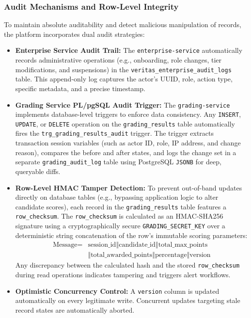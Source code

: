 \subsubsection{Audit Mechanisms and Row-Level Integrity}
To maintain absolute auditability and detect malicious manipulation of records, the platform incorporates dual audit strategies:
\begin{itemize}
    \item \textbf{Enterprise Service Audit Trail:} The \texttt{enterprise-service} automatically records administrative operations (e.g., onboarding, role changes, tier modifications, and suspensions) in the \texttt{veritas\_enterprise\_audit\_logs} table. This append-only log captures the actor's UUID, role, action type, specific metadata, and a precise timestamp.
    \item \textbf{Grading Service PL/pgSQL Audit Trigger:} The \texttt{grading-service} implements database-level triggers to enforce data consistency. Any \texttt{INSERT}, \texttt{UPDATE}, or \texttt{DELETE} operation on the \texttt{grading\_results} table automatically fires \linebreak the \texttt{trg\_grading\_results\_audit} trigger. The trigger extracts transaction session variables (such as actor ID, role, IP address, and change reason), compares the before and after states, and logs the change set in a separate \texttt{grading\_audit\_log} table using PostgreSQL \texttt{JSONB} for deep, queryable diffs.
    \item \textbf{Row-Level HMAC Tamper Detection:} To prevent out-of-band updates directly on database tables (e.g., bypassing application logic to alter candidate scores), each record in the \texttt{grading\_results} table features a \texttt{row\_checksum}. \linebreak The \texttt{row\_checksum} is calculated as an HMAC-SHA256 signature using a cryptographically secure \texttt{GRADING\_SECRET\_KEY} over a deterministic string concatenation of the row's immutable scoring parameters:
    \[
    \begin{aligned}
    \text{Message} ={}& \text{session\_id} \mathbin{\Vert} \text{candidate\_id} \mathbin{\Vert} \text{total\_max\_points} \\
    &\mathbin{\Vert} \text{total\_awarded\_points} \mathbin{\Vert} \text{percentage} \mathbin{\Vert} \text{version}
    \end{aligned}
    \]
    Any discrepancy between the calculated hash and the stored \texttt{row\_checksum} during read operations indicates tampering and triggers alert workflows.
    \item \textbf{Optimistic Concurrency Control:} A \texttt{version} column is updated automatically on every legitimate write. Concurrent updates targeting stale record states are automatically aborted.
\end{itemize}


